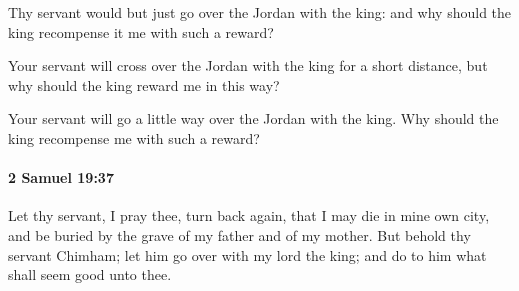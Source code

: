 			\begin{versebox}
					\item[BHS] 
					\item[ASV] Thy servant would but just go over the Jordan with the king: and why should the king recompense it me with such a reward?
					\item[NIV] Your servant will cross over the Jordan with the king for a short distance, but why should the king reward me in this way?
					\item[NRSV] Your servant will go a little way over the Jordan with the king. Why should the king recompense me with such a reward?
			\end{versebox}

		\paragraph{2 Samuel 19:37} %
			\label{2SAMUEL-19-37}

			Let thy servant, I pray thee, turn back again, that I may die in mine own city, and be buried by the grave of my father and of my mother. But behold thy servant Chimham; let him go over with my lord the king; and do to him what shall seem good unto thee.

